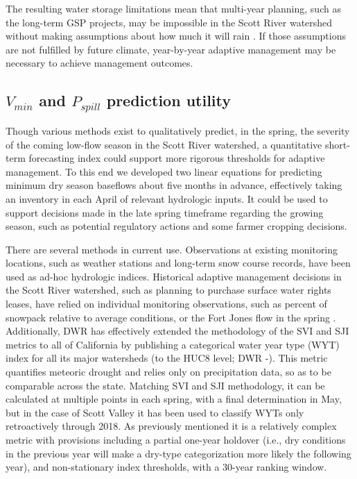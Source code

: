 \documentclass[hess, manuscript]{copernicus}
\begin{document}
The resulting water storage limitations mean that multi-year planning,
such as the long-term GSP projects, may be impossible in the Scott River
watershed without making assumptions about how much it will rain
\citeyearpar[i.e., the future climate predictions in Siskiyou
County][]{SiskiyouCounty2021}. If those assumptions are not fulfilled by
future climate, year-by-year adaptive management may be necessary to
achieve management outcomes.

\subsection{\texorpdfstring{\(V_{min}\) and \(P_{spill}\) prediction
utility}{V\_\{min\} and P\_\{spill\} prediction utility}}

Though various methods exist to qualitatively predict, in the spring,
the severity of the coming low-flow season in the Scott River watershed,
a quantitative short-term forecasting index could support more rigorous
thresholds for adaptive management. To this end we developed two linear
equations for predicting minimum dry season baseflows about five months
in advance, effectively taking an inventory in each April of relevant
hydrologic inputs. It could be used to support decisions made in the
late spring timeframe regarding the growing season, such as potential
regulatory actions and some farmer cropping decisions.

There are several methods in current use. Observations at existing
monitoring locations, such as weather stations and long-term snow course
records, have been used as ad-hoc hydrologic indices. Historical
adaptive management decisions in the Scott River watershed, such as
planning to purchase surface water rights leases, have relied on
individual monitoring observations, such as percent of snowpack relative
to average conditions, or the Fort Jones flow in the spring
\citeyearpar[e.g., SRWT][]{SRWT2018}. Additionally, DWR has effectively
extended the methodology of the SVI and SJI metrics to all of California
by publishing a categorical water year type (WYT) index for all its
major watersheds (to the HUC8 level; DWR -\citet{DWR2021a}). This metric
quantifies meteoric drought and relies only on precipitation data, so as
to be comparable across the state. Matching SVI and SJI methodology, it
can be calculated at multiple points in each spring, with a final
determination in May, but in the case of Scott Valley it has been used
to classify WYTs only retroactively through 2018. As previously
mentioned it is a relatively complex metric with provisions including a
partial one-year holdover (i.e., dry conditions in the previous year
will make a dry-type categorization more likely the following year), and
non-stationary index thresholds, with a 30-year ranking window.
\end{document}
